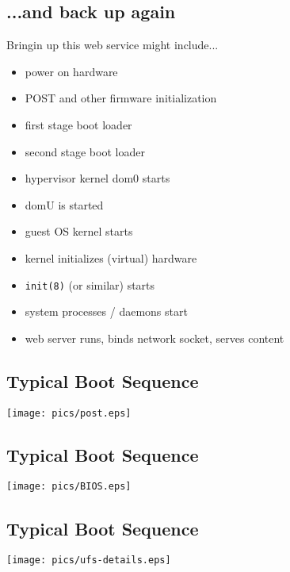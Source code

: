\documentclass[xga]{xdvislides}
\begin{document}
\subsection{...and back up again}
Bringin up this web service might include...
\\

\begin{itemize}
	\item power on hardware
	\item POST and other firmware initialization
	\item first stage boot loader
	\item second stage boot loader
	\item hypervisor kernel dom0 starts
	\item domU is started
	\item guest OS kernel starts
	\item kernel initializes (virtual) hardware
	\item {\tt init(8)} (or similar) starts
	\item system processes / daemons start
	\item web server runs, binds network socket, serves content
\end{itemize}


\subsection{Typical Boot Sequence}
\vspace*{\fill}
\begin{center}
	\texttt{[image: pics/post.eps]} \\
\end{center}
\vspace*{\fill}

\subsection{Typical Boot Sequence}
\vspace*{\fill}
\begin{center}
	\texttt{[image: pics/BIOS.eps]} \\
\end{center}
\vspace*{\fill}

\subsection{Typical Boot Sequence}
\vspace*{\fill}
\begin{center}
	\texttt{[image: pics/ufs-details.eps]} \\
\end{center}
\vspace*{\fill}
\end{document}
